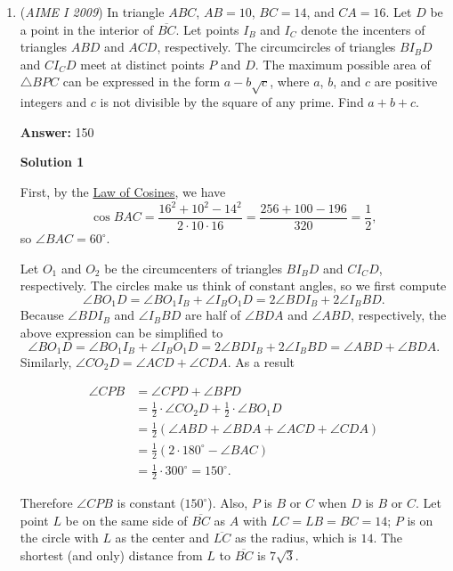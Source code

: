 \begin{enumerate}
 


	\item (\textit{AIME I 2009}) In triangle $ABC$, $AB = 10$, $BC = 14$, and $CA = 16$. Let $D$ be a point in the interior of $\overline{BC}$. Let points $I_B$ and $I_C$ denote the incenters of triangles $ABD$ and $ACD$, respectively. The circumcircles of triangles $BI_BD$ and $CI_CD$ meet at distinct points $P$ and $D$. The maximum possible area of $\triangle BPC$ can be expressed in the form $a - b\sqrt {c}$, where $a$, $b$, and $c$ are positive integers and $c$ is not divisible by the square of any prime. Find $a + b + c$.


 
 \textbf{Answer: }150



\textbf{Solution 1}

First, by the \href{https://artofproblemsolving.com/wiki/index.php?title=Law\_of\_Cosines}{Law of Cosines}, we have 
 \[\cos BAC = \frac {16^2 + 10^2 - 14^2}{2\cdot 10 \cdot 16} = \frac {256+100-196}{320} = \frac {1}{2},\] so $\angle BAC = 60^\circ$.

 Let $O_1$ and $O_2$ be the circumcenters of triangles $BI_BD$ and $CI_CD$, respectively.  The circles make us think of constant angles, so we first compute 
 \[\angle BO_1D = \angle BO_1I_B + \angle I_BO_1D = 2\angle BDI_B + 2\angle I_BBD.\] Because $\angle BDI_B$ and $\angle I_BBD$ are half of $\angle BDA$ and $\angle ABD$, respectively, the above expression can be simplified to 
 \[\angle BO_1D = \angle BO_1I_B + \angle I_BO_1D = 2\angle BDI_B + 2\angle I_BBD = \angle ABD + \angle BDA.\] Similarly, $\angle CO_2D = \angle ACD + \angle CDA$.  As a result

 
 \begin{align*}\angle CPB &= \angle CPD + \angle BPD \\&= \frac {1}{2} \cdot \angle CO_2D + \frac {1}{2} \cdot \angle BO_1D \\&= \frac {1}{2}(\angle ABD + \angle BDA + \angle ACD + \angle CDA) \\&= \frac {1}{2} (2 \cdot 180^\circ - \angle BAC) \\&= \frac {1}{2} \cdot 300^\circ = 150^\circ.\end{align*}


 Therefore $\angle CPB$ is constant ($150^\circ$). Also, $P$ is $B$ or $C$ when $D$ is $B$ or $C$. Let point $L$ be on the same side of $\overline{BC}$ as $A$ with $LC = LB = BC = 14$; $P$ is on the circle with $L$ as the center and $\overline{LC}$ as the radius, which is $14$. The shortest (and only) distance from $L$ to $\overline{BC}$ is $7\sqrt {3}$.


\end{enumerate}
